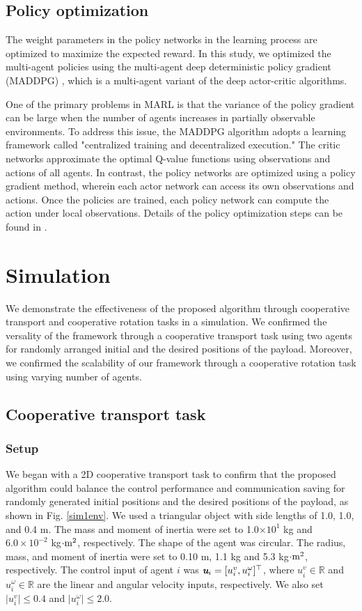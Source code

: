 \documentclass[letterpaper, 10 pt, conference]{ieeeconf} %
\begin{document}
\subsection{Policy optimization}
The weight parameters in the policy networks in the learning process are optimized to maximize the expected reward.
In this study, we optimized the multi-agent policies using the multi-agent deep deterministic policy gradient (MADDPG) \cite{Lowe2017}, which is a multi-agent variant of the deep actor-critic algorithms.

One of the primary problems in MARL is that the variance of the policy gradient can be large when the number of agents increases in partially
observable environments. To address this issue, the MADDPG algorithm adopts a learning framework called "centralized training and
decentralized execution." The critic networks approximate the optimal Q-value functions using observations and actions of all agents.
In contrast, the policy networks are optimized using a policy gradient method, wherein each actor network can access its own observations and
actions. Once the policies are trained, each policy network can compute the action under local observations.
Details of the policy optimization steps can be found in \cite{Lowe2017}.

\section{Simulation}
We demonstrate the effectiveness of the proposed algorithm through cooperative transport and cooperative rotation tasks in a simulation.
We confirmed the versality of the framework through a cooperative transport task using two agents for randomly arranged initial
and the desired positions of the payload.
Moreover, we confirmed the scalability of our framework through a cooperative rotation task using varying number of agents.

\subsection{Cooperative transport task}
\subsubsection{Setup}
We began with a 2D cooperative transport task to confirm that the proposed algorithm could balance the control performance and communication saving for randomly generated initial positions and the desired positions of the payload, as shown in Fig. \ref{sim1env}.
We used a triangular object with side lengths of 1.0, 1.0, and 0.4 m.
The mass and moment of inertia were set to 1.0$\times10^{1}$ kg and $6.0\times10^{-2}$ kg$\cdot \rm{}m^2$, respectively.
The shape of the agent was circular. The radius, mass, and moment of inertia were set to 0.10 m, 1.1 kg and 5.3 kg$\cdot \rm{}m^2$, respectively.
The control input of agent $i$ was $\textit{\textbf{u}}_i=[u^v_i, u^{\omega}_i]^{\top}$, where $u^v_i\in \mathbb{R}$ and $u^{\omega}_i\in \mathbb{R}$ are the linear and angular velocity inputs, respectively.
We also set $\mid u^v_i\mid \le 0.4$ and $\mid u^{\omega}_i\mid \le 2.0$.
\end{document}
